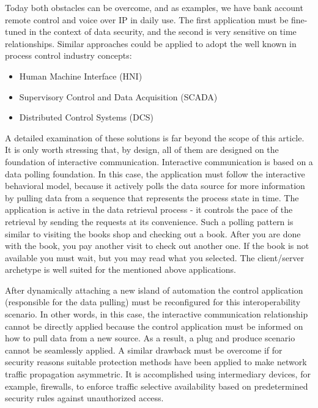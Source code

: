 \documentclass{jacsart}
\begin{document}
Today both obstacles can be overcome, and as examples, we have bank account remote control and voice over IP in daily use. The first application must be fine-tuned in the context of data security, and the second is very sensitive on time relationships. Similar approaches could be applied to adopt the well known in process control industry concepts:

\begin{itemize}
      \item  Human Machine Interface (HNI)
      \item Supervisory Control and Data Acquisition (SCADA)
      \item Distributed Control Systems (DCS)
\end{itemize}

A detailed examination of these solutions is far beyond the scope of this article. It is only worth stressing that, by design, all of them are designed on the foundation of interactive communication. Interactive communication is based on a data polling foundation. In this case, the application must follow the interactive behavioral model, because it actively polls the data source for more information by pulling data from a sequence that represents the process state in time. The application is active in the data retrieval process - it controls the pace of the retrieval by sending the requests at its convenience. Such a polling pattern is similar to visiting the books shop and checking out a book. After you are done with the book, you pay another visit to check out another one. If the book is not available you must wait, but you may read what you selected. The client/server archetype is well suited for the mentioned above applications.

After dynamically attaching a new island of automation the control application (responsible for the data pulling) must be reconfigured for this interoperability scenario. In other words, in this case, the interactive communication relationship cannot be directly applied because the control application must be informed on how to pull data from a new source. As a result, a plug and produce scenario cannot be seamlessly applied. A similar drawback must be overcome if for security reasons suitable protection methods have been applied to make network traffic propagation asymmetric. It is accomplished using intermediary devices, for example, firewalls, to enforce traffic selective availability based on predetermined security rules against unauthorized access.
\end{document}
